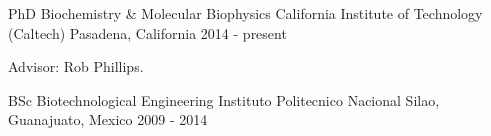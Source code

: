 

\begin{cventries}

  \cventry
    {PhD Biochemistry \& Molecular Biophysics} %
    {California Institute of Technology (Caltech)} %
    {Pasadena, California} %
    {2014 - present} %
    {
      \begin{cvitems} %
        \item {Advisor: Rob Phillips.}
      \end{cvitems}
    }

  \cventry
    {BSc Biotechnological Engineering} %
    {Instituto Politecnico Nacional} %
    {Silao, Guanajuato, Mexico} %
    {2009 - 2014} %
    {}
\end{cventries}